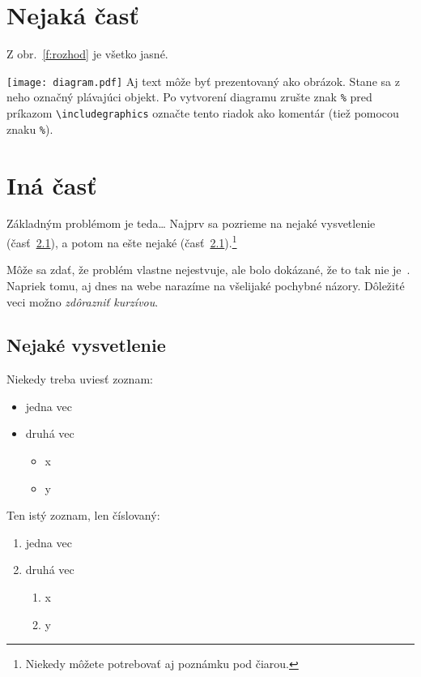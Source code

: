 \documentclass[10pt,twoside,slovak,a4paper]{article}
\begin{document}
\section{Nejaká časť} \label{nejaka}

Z obr.~\ref{f:rozhod} je všetko jasné. 

\begin{figure*}[tbh]
\centering
\texttt{[image: diagram.pdf]}
Aj text môže byť prezentovaný ako obrázok. Stane sa z neho označný plávajúci objekt. Po vytvorení diagramu zrušte znak \texttt{\%} pred príkazom \verb|\includegraphics| označte tento riadok ako komentár (tiež pomocou znaku \texttt{\%}).
\caption{Rozhodujúci argument.}
\label{f:rozhod}
\end{figure*}



\section{Iná časť} \label{ina}

Základným problémom je teda\ldots{} Najprv sa pozrieme na nejaké vysvetlenie (časť~\ref{ina:nejake}), a potom na ešte nejaké (časť~\ref{ina:nejake}).\footnote{Niekedy môžete potrebovať aj poznámku pod čiarou.}

Môže sa zdať, že problém vlastne nejestvuje\cite{Coplien:MPD}, ale bolo dokázané, že to tak nie je~\cite{Czarnecki:Staged, Czarnecki:Progress}. Napriek tomu, aj dnes na webe narazíme na všelijaké pochybné názory\cite{PLP-Framework}. Dôležité veci možno \emph{zdôrazniť kurzívou}.


\subsection{Nejaké vysvetlenie} \label{ina:nejake}

Niekedy treba uviesť zoznam:

\begin{itemize}
\item jedna vec
\item druhá vec
	\begin{itemize}
	\item x
	\item y
	\end{itemize}
\end{itemize}

Ten istý zoznam, len číslovaný:

\begin{enumerate}
\item jedna vec
\item druhá vec
	\begin{enumerate}
	\item x
	\item y
	\end{enumerate}
\end{enumerate}
\end{document}
